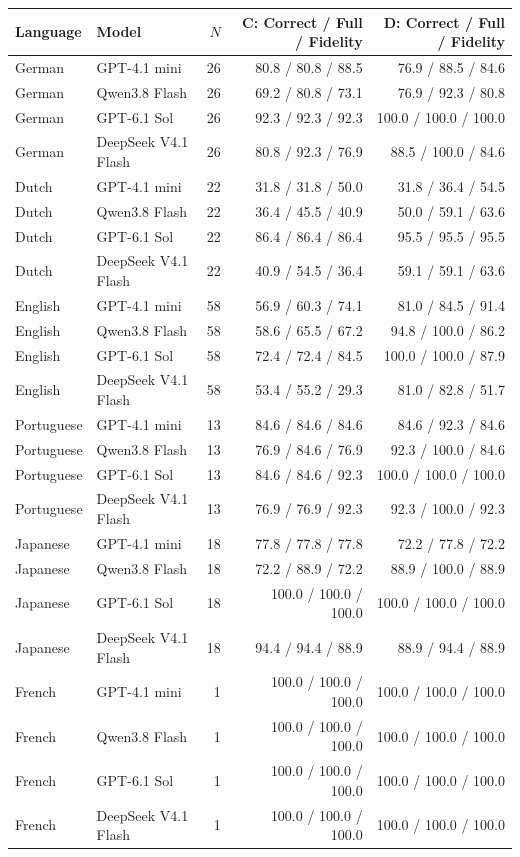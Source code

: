 \begin{tabular}{llrrr}
\toprule
Language & Model & $N$ & C: Correct / Full / Fidelity & D: Correct / Full / Fidelity \\
\midrule
German & GPT-4.1 mini & 26 & 80.8 / 80.8 / 88.5 & 76.9 / 88.5 / 84.6 \\
German & Qwen3.8 Flash & 26 & 69.2 / 80.8 / 73.1 & 76.9 / 92.3 / 80.8 \\
German & GPT-6.1 Sol & 26 & 92.3 / 92.3 / 92.3 & 100.0 / 100.0 / 100.0 \\
German & DeepSeek V4.1 Flash & 26 & 80.8 / 92.3 / 76.9 & 88.5 / 100.0 / 84.6 \\
Dutch & GPT-4.1 mini & 22 & 31.8 / 31.8 / 50.0 & 31.8 / 36.4 / 54.5 \\
Dutch & Qwen3.8 Flash & 22 & 36.4 / 45.5 / 40.9 & 50.0 / 59.1 / 63.6 \\
Dutch & GPT-6.1 Sol & 22 & 86.4 / 86.4 / 86.4 & 95.5 / 95.5 / 95.5 \\
Dutch & DeepSeek V4.1 Flash & 22 & 40.9 / 54.5 / 36.4 & 59.1 / 59.1 / 63.6 \\
English & GPT-4.1 mini & 58 & 56.9 / 60.3 / 74.1 & 81.0 / 84.5 / 91.4 \\
English & Qwen3.8 Flash & 58 & 58.6 / 65.5 / 67.2 & 94.8 / 100.0 / 86.2 \\
English & GPT-6.1 Sol & 58 & 72.4 / 72.4 / 84.5 & 100.0 / 100.0 / 87.9 \\
English & DeepSeek V4.1 Flash & 58 & 53.4 / 55.2 / 29.3 & 81.0 / 82.8 / 51.7 \\
Portuguese & GPT-4.1 mini & 13 & 84.6 / 84.6 / 84.6 & 84.6 / 92.3 / 84.6 \\
Portuguese & Qwen3.8 Flash & 13 & 76.9 / 84.6 / 76.9 & 92.3 / 100.0 / 84.6 \\
Portuguese & GPT-6.1 Sol & 13 & 84.6 / 84.6 / 92.3 & 100.0 / 100.0 / 100.0 \\
Portuguese & DeepSeek V4.1 Flash & 13 & 76.9 / 76.9 / 92.3 & 92.3 / 100.0 / 92.3 \\
Japanese & GPT-4.1 mini & 18 & 77.8 / 77.8 / 77.8 & 72.2 / 77.8 / 72.2 \\
Japanese & Qwen3.8 Flash & 18 & 72.2 / 88.9 / 72.2 & 88.9 / 100.0 / 88.9 \\
Japanese & GPT-6.1 Sol & 18 & 100.0 / 100.0 / 100.0 & 100.0 / 100.0 / 100.0 \\
Japanese & DeepSeek V4.1 Flash & 18 & 94.4 / 94.4 / 88.9 & 88.9 / 94.4 / 88.9 \\
French & GPT-4.1 mini & 1 & 100.0 / 100.0 / 100.0 & 100.0 / 100.0 / 100.0 \\
French & Qwen3.8 Flash & 1 & 100.0 / 100.0 / 100.0 & 100.0 / 100.0 / 100.0 \\
French & GPT-6.1 Sol & 1 & 100.0 / 100.0 / 100.0 & 100.0 / 100.0 / 100.0 \\
French & DeepSeek V4.1 Flash & 1 & 100.0 / 100.0 / 100.0 & 100.0 / 100.0 / 100.0 \\
\bottomrule
\end{tabular}
